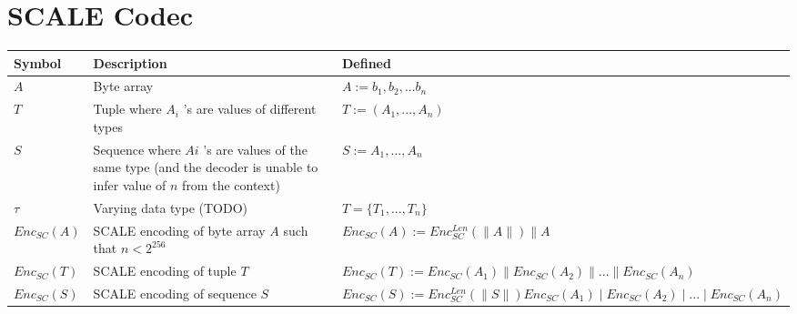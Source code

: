 \documentclass[11pt,a4paper]{article}
\begin{document}
\section*{SCALE Codec}
\begin{center}
 \begin{tabulary}{1.0\textwidth}{LLL}
  \textbf{Symbol} & \textbf{Description} & \textbf{Defined} \\
  \hline
\(A\) &Byte array& \(A := b_1, b_2, ... b_n\) \\
\(T\) &Tuple where \(A_i\) 's are values of different types& \(T := (A_1, ..., A_n)\) \\
\(S\) &Sequence where \(Ai\) 's are values of the same type (and the decoder is unable to infer value of \(n\) from the context)& \(S := A_1, ..., A_n\) \\
\(\tau\) &Varying data type (TODO)& \(T = \{T_1, ..., T_n\}\) \\
\(Enc_{SC}(A)\) &SCALE encoding of byte array \(A\) such that \(n < 2^{256}\) & \(Enc_{SC}(A) := Enc^{Len}_{SC}(\parallel A \parallel)\parallel A\) \\
\(Enc_{SC}(T)\) &SCALE encoding of tuple \(T\) & \(Enc_{SC}(T) := Enc_{SC}(A_1)\parallel Enc_{SC}(A_2)\parallel ... \parallel Enc_{SC}(A_n)\) \\
\(Enc_{SC}(S)\) &SCALE encoding of sequence \(S\) & \(Enc_{SC}(S) := Enc^{Len}_{SC}(\parallel S \parallel) Enc_{SC}(A_1)\mid Enc_{SC}(A_2)\mid ... \mid Enc_{SC}(A_n)\) \\
 \end{tabulary}
\end{center}
\end{document}

